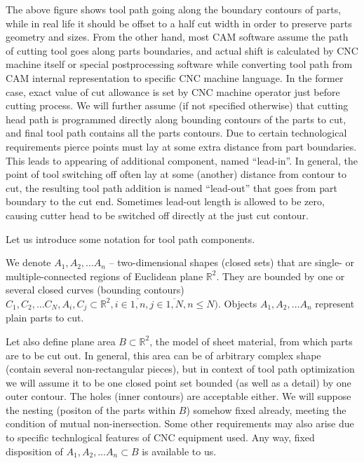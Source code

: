 \documentclass{../download/tPRS2e}
\begin{document}
The above figure shows tool path going
along the boundary contours of parts,
while in real life it should be offset to
a half cut width in order to preserve parts geometry and sizes.
From the other hand,
most CAM software assume
the path of cutting tool goes
along parts boundaries,
and actual shift is calculated
by CNC machine itself
or special postprocessing software
while converting tool path
from CAM internal representation
to specific CNC machine language.
In the former case,
exact value of cut allowance
is set by CNC machine operator
just before cutting process.
We will further assume
(if not specified otherwise)
that cutting head path is programmed
directly along bounding contours of the parts to cut,
and final tool path contains all the parts contours.
Due to certain technological requirements
pierce points must lay at some extra distance
from part boundaries.
This leads to appearing of additional component,
named ``lead-in''.
In general,
the point of tool switching off
often lay at some
(another) distance from contour to cut,
the resulting tool path addition
is named ``lead-out''
that goes from part boundary to the cut end.
Sometimes lead-out length is allowed to be zero,
causing cutter head to be switched off
directly at the just cut contour.

Let us introduce some notation for tool path components.

We denote $A_1, A_2, \dots A_n$ -- two-dimensional shapes
(closed sets)
that are single- or multiple-connected
regions of Euclidean plane
$\mathbb R^2$.
They are bounded by one or several closed curves
(bounding contours)
$C_1, C_2, \dots C_N,
A_i, C_j \subset \mathbb R^2,
i \in \overline{1, n},
j \in \overline{1, N},
n \leqslant N)$.
Objects $A_1, A_2, \dots A_n$
represent plain parts to cut.

Let also define plane area
$B \subset \mathbb R^2$,
the model of 
sheet material, from which parts are to be cut out.
In general,
this area can be of arbitrary complex shape
(contain several non-rectangular pieces),
but in context of tool path optimization
we will assume it to be
one closed point set bounded
(as well as a detail) by one outer contour.
The holes
(inner contours) are acceptable either.
We will suppose the nesting
(positon of the parts within $B$)
somehow fixed already,
meeting the condition of
mutual non-inersection.
Some other requirements may also arise
due to specific technlogical features
of CNC equipment used.
Any way,
fixed disposition of
$A_1, A_2, \dots A_n \subset B$
is available to us.
\end{document}
